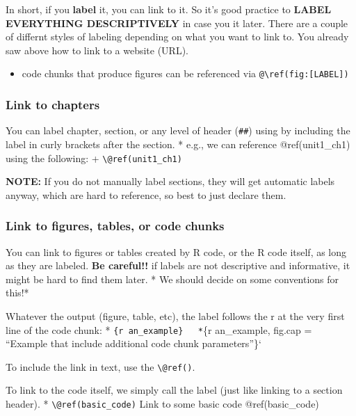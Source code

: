 \documentclass[
]{book}
\providecommand{\tightlist}{%
  \setlength{\itemsep}{0pt}\setlength{\parskip}{0pt}}
\begin{document}
In short, if you \textbf{label} it, you can link to it. So it's good practice to
\textbf{LABEL EVERYTHING DESCRIPTIVELY} in case you it later. There are a couple of differnt styles of labeling depending on what you want to link to. You already saw above how to link to a website (URL).

\begin{itemize}
\tightlist
\item
  code chunks that produce figures can be referenced via \texttt{@\textbackslash{}ref(fig:{[}LABEL{]})}
\end{itemize}

\hypertarget{link-to-chapters}{%
\subsubsection{Link to chapters}\label{link-to-chapters}}

You can label chapter, section, or any level of header (\texttt{\#\#}) using by including the label in curly brackets after the section.
* e.g., we can reference @ref(unit1\_ch1) using the following:
+ \texttt{\textbackslash{}@ref(unit1\_ch1)}

\textbf{NOTE:} If you do not manually label sections, they will get automatic labels anyway, which are hard to reference, so best to just declare them.

\hypertarget{link-to-figures-tables-or-code-chunks}{%
\subsubsection{Link to figures, tables, or code chunks}\label{link-to-figures-tables-or-code-chunks}}

You can link to figures or tables created by R code, or the R code itself, as long as they are labeled.
\textbf{Be careful!!} if labels are not descriptive and informative, it might be hard to find them later.
* We should decide on some conventions for this!*

Whatever the output (figure, table, etc), the label follows the r at the very first line of the code chunk:
* \texttt{\{r\ an\_example\}\textasciigrave{}\ \ \ *}\{r an\_example, fig.cap = ``Example that include additional code chunk parameters''\}`

To include the link in text, use the \texttt{\textbackslash{}@ref()}.

To link to the code itself, we simply call the label (just like linking to a section header).
* \texttt{\textbackslash{}@ref(basic\_code)} Link to some basic code @ref(basic\_code)
\end{document}
